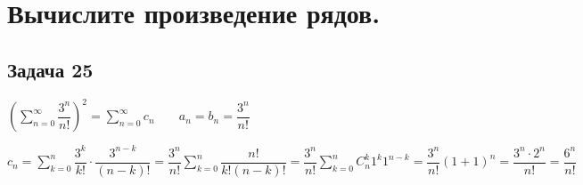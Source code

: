 \documentclass[a4paper,fleqn]{article}
\begin{document}
	
	\section*{Вычислите произведение рядов.}
	
	\subsection*{Задача 25}
	$ \left(\sum_{n = 0}^{\infty}\dfrac{3^n}{n!}\right)^2  = \sum_{n=0}^{\infty} c_n \;\;\;\;\;\;\; a_n = b_n = \dfrac{3^n}{n!}$
	
	$ c_n = \sum_{k=0}^{n} \dfrac{3^k}{k!}\cdot \dfrac{3^{n-k}}{(n-k)!} = \dfrac{3^n}{n!} \sum_{k=0}^{n}\dfrac{n!}{k!(n-k)!} = \dfrac{3^n}{n!}\sum_{k=0}^{n}C_n^k 1^k1^{n-k} = \dfrac{3^n}{n!}(1+1)^n = \dfrac{3^n \cdot 2^n}{n!}  = \dfrac{6^n}{n!}$
	
\end{document}

